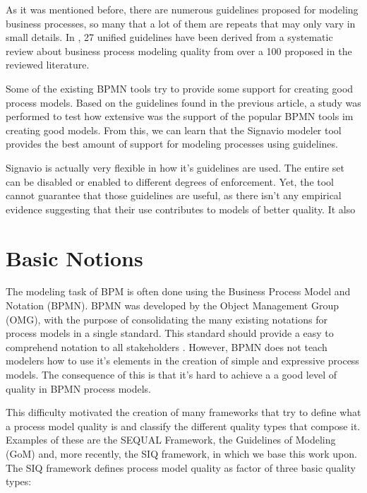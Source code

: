 \documentclass{llncs}
\begin{document}
As it was mentioned before, there are numerous guidelines proposed for modeling business processes, so many that a lot of them are repeats that may only vary in small details. In \cite{Moreno-MontesdeOca2014}, 27 unified guidelines have been derived from a systematic review about business process modeling quality from over a 100 proposed in the reviewed literature. 

Some of the existing BPMN tools try to provide some support for creating good process models. Based on the guidelines found in the previous article, a study \cite{MoniqueSnoeckIsel2015} was performed to test how extensive was the support of the popular BPMN tools im creating good models. From this, we can learn that the Signavio modeler tool provides the best amount of support for modeling processes using guidelines. 

Signavio is actually very flexible in how it's guidelines are used. The entire set can be disabled or enabled to different degrees of enforcement. Yet, the tool cannot guarantee that those guidelines are useful, as there isn't any empirical evidence suggesting that their use contributes to models of better quality. It also 

\section{Basic Notions}\label{Fundamentals}\label{Background}

The modeling task of BPM is often done using the Business Process Model and Notation (BPMN). BPMN was developed by the Object Management Group (OMG), with the purpose of consolidating the many existing notations for process models in a single standard. This standard should provide a easy to comprehend notation to all stakeholders \cite{OMGObjectManagementGroup2015}. However, BPMN does not teach modelers how to use it's elements in the creation of simple and expressive process models. The consequence of this is that it's hard to achieve a a good level of quality in BPMN process models.


This difficulty motivated the creation of many frameworks that try to define what a process model quality is and classify the different quality types that compose it. Examples of these are the SEQUAL Framework, the Guidelines of Modeling (GoM) and, more recently, the SIQ framework, in which we base this work upon. The SIQ framework defines process model quality as factor of three basic quality types:
\end{document}
